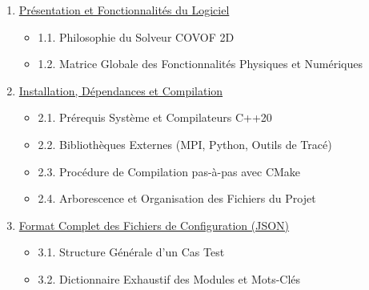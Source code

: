 \documentclass[
  french,
]{article}
\providecommand{\tightlist}{%
  \setlength{\itemsep}{0pt}\setlength{\parskip}{0pt}}
\begin{document}
\begin{enumerate}
\def\labelenumi{\arabic{enumi}.}
\tightlist
\item
  \hyperref[1-pruxe9sentation-et-fonctionnalituxe9s-du-logiciel]{Présentation
  et Fonctionnalités du Logiciel}

  \begin{itemize}
  \tightlist
  \item
    1.1. Philosophie du Solveur COVOF 2D
  \item
    1.2. Matrice Globale des Fonctionnalités Physiques et Numériques
  \end{itemize}
\item
  \hyperref[2-installation-duxe9pendances-et-compilation]{Installation,
  Dépendances et Compilation}

  \begin{itemize}
  \tightlist
  \item
    2.1. Prérequis Système et Compilateurs C++20
  \item
    2.2. Bibliothèques Externes (MPI, Python, Outils de Tracé)
  \item
    2.3. Procédure de Compilation pas-à-pas avec CMake
  \item
    2.4. Arborescence et Organisation des Fichiers du Projet
  \end{itemize}
\item
  \hyperref[3-format-complet-des-fichiers-de-configuration-json]{Format
  Complet des Fichiers de Configuration (JSON)}

  \begin{itemize}
  \tightlist
  \item
    3.1. Structure Générale d'un Cas Test
  \item
    3.2. Dictionnaire Exhaustif des Modules et Mots-Clés


\end{itemize}
\end{enumerate}
\end{document}
